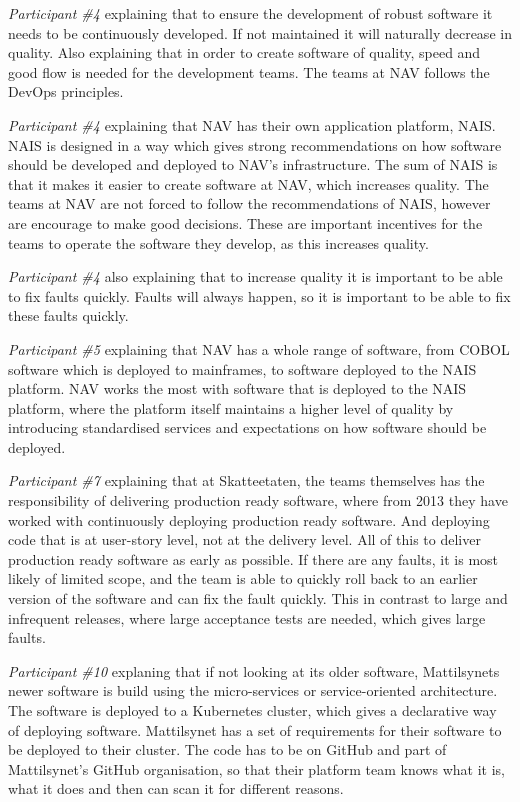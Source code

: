 \textit{Participant \#4} explaining that to ensure the development of robust software it needs to be continuously developed. If not maintained it will naturally decrease in quality. Also explaining that in order to create software of quality, speed and good flow is needed for the development teams. The teams at NAV follows the DevOps principles.

\textit{Participant \#4} explaining that NAV has their own application platform, NAIS. NAIS is designed in a way which gives strong recommendations on how software should be developed and deployed to NAV's infrastructure. The sum of NAIS is that it makes it easier to create software at NAV, which increases quality. The teams at NAV are not forced to follow the recommendations of NAIS, however are encourage to make good decisions. These are important incentives for the teams to operate the software they develop, as this increases quality.

\textit{Participant \#4} also explaining that to increase quality it is important to be able to fix faults quickly. Faults will always happen, so it is important to be able to fix these faults quickly.

\textit{Participant \#5} explaining that NAV has a whole range of software, from COBOL software which is deployed to mainframes, to software deployed to the NAIS platform. NAV works the most with software that is deployed to the NAIS platform, where the platform itself maintains a higher level of quality by introducing standardised services and expectations on how software should be deployed.

\textit{Participant \#7} explaining that at Skatteetaten, the teams themselves has the responsibility of delivering production ready software, where from 2013 they have worked with continuously deploying production ready software. And deploying code that is at user-story level, not at the delivery level. All of this to deliver production ready software as early as possible. If there are any faults, it is most likely of limited scope, and the team is able to quickly roll back to an earlier version of the software and can fix the fault quickly. This in contrast to large and infrequent releases, where large acceptance tests are needed, which gives large faults.

\textit{Participant \#10} explaning that if not looking at its older software, Mattilsynets newer software is build using the micro-services or service-oriented architecture. The software is deployed to a Kubernetes cluster, which gives a declarative way of deploying software. Mattilsynet has a set of requirements for their software to be deployed to their cluster. The code has to be on GitHub and part of Mattilsynet's GitHub organisation, so that their platform team knows what it is, what it does and then can scan it for different reasons.


